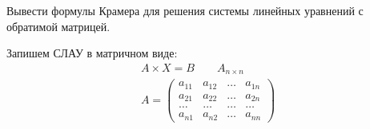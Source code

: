 \begin{question}
  Вывести формулы Крамера для решения системы линейных уравнений с обратимой матрицей.
\end{question} 
\begin{answer}
  Запишем СЛАУ в матричном виде: 
\begin{gather*}
  A \times X = B \qquad A_{n \times n} \\
  A = \left( 
  \begin{matrix}
    a_{11} & a_{12} & \ldots & a_{1n} \\
    a_{21} & a_{22} & \ldots & a_{2n} \\
    \ldots & \ldots & \ldots & \ldots \\
    a_{n1} & a_{n2} & \ldots & a_{nn}
  \end{matrix}
  \right) 
\end{gather*}


\end{answer}
